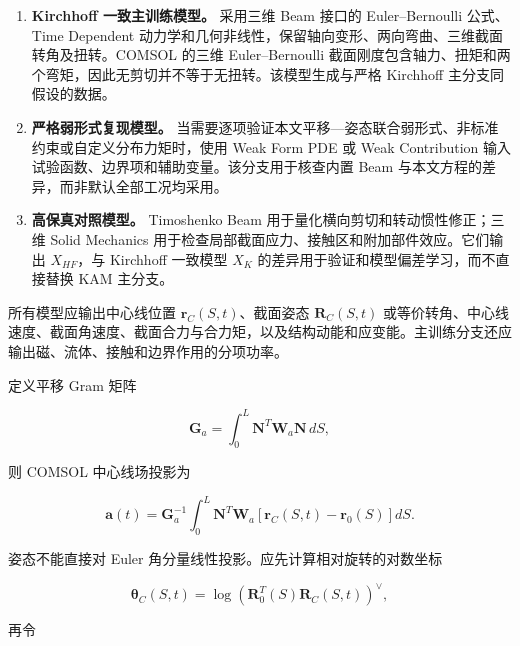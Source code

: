 \begin{enumerate}
\def\labelenumi{\arabic{enumi}.}
\tightlist
\item
  \textbf{Kirchhoff 一致主训练模型。} 采用三维 Beam 接口的 Euler--Bernoulli 公式、Time Dependent 动力学和几何非线性，保留轴向变形、两向弯曲、三维截面转角及扭转。COMSOL 的三维 Euler--Bernoulli 截面刚度包含轴力、扭矩和两个弯矩，因此无剪切并不等于无扭转\cite{COMSOLBeamInterface2025,COMSOLSectionStiffness2025}。该模型生成与严格 Kirchhoff 主分支同假设的数据。
\item
  \textbf{严格弱形式复现模型。} 当需要逐项验证本文平移---姿态联合弱形式、非标准约束或自定义分布力矩时，使用 Weak Form PDE 或 Weak Contribution 输入试验函数、边界项和辅助变量\cite{COMSOLWeakFormPDE2025,COMSOLWeakContribution2025}。该分支用于核查内置 Beam 与本文方程的差异，而非默认全部工况均采用。
\item
  \textbf{高保真对照模型。} Timoshenko Beam 用于量化横向剪切和转动惯性修正；三维 Solid Mechanics 用于检查局部截面应力、接触区和附加部件效应。它们输出 \(X_{HF}\)，与 Kirchhoff 一致模型 \(X_{K}\) 的差异用于验证和模型偏差学习，而不直接替换 KAM 主分支。
\end{enumerate}

所有模型应输出中心线位置 \(\mathbf{r}_{C}(S,t)\)、截面姿态 \(\mathbf{R}_{C}(S,t)\) 或等价转角、中心线速度、截面角速度、截面合力与合力矩，以及结构动能和应变能。主训练分支还应输出磁、流体、接触和边界作用的分项功率。

定义平移 Gram 矩阵

\begin{equation}
\label{eq:galerkin-2-116}
\mathbf{G}_{a} = \int_{0}^{L}\mathbf{N}^{T}\mathbf{W}_{a}\mathbf{N}\, dS,
\end{equation}

则 COMSOL 中心线场投影为

\begin{equation}
\label{eq:galerkin-2-117}
\mathbf{a}(t) = \mathbf{G}_{a}^{- 1}\int_{0}^{L}\mathbf{N}^{T}\mathbf{W}_{a}\left\lbrack \mathbf{r}_{C}(S,t) - \mathbf{r}_{0}(S) \right\rbrack dS.
\end{equation}

姿态不能直接对 Euler 角分量线性投影。应先计算相对旋转的对数坐标

\begin{equation}
\label{eq:galerkin-2-118}
\bm{\theta}_{C}(S,t) = \log\left( \mathbf{R}_{0}^{T}(S)\mathbf{R}_{C}(S,t) \right)^{\vee},
\end{equation}

再令

